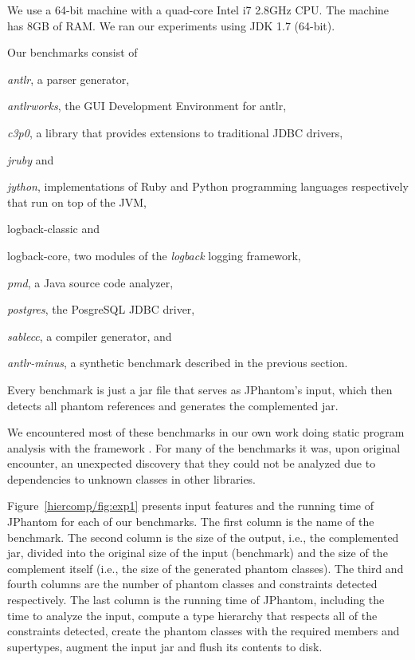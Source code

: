 We use a 64-bit machine with a quad-core Intel i7 2.8GHz CPU. The
machine has 8GB of RAM. We ran our experiments using JDK 1.7
(64-bit).

Our benchmarks consist of
\begin{inparaenum}[(1)]
\item \emph{antlr}, a parser generator,
\item \emph{antlrworks}, the GUI Development Environment for antlr,
\item \emph{c3p0}, a library that provides extensions to traditional
  JDBC drivers,
\item \emph{jruby} and
\item \emph{jython}, implementations of Ruby and Python programming
  languages respectively that run on top of the JVM,
\item logback-classic and
\item logback-core, two modules of the \emph{logback} logging
  framework,
\item \emph{pmd}, a Java source code analyzer,
\item \emph{postgres}, the PosgreSQL JDBC driver,
\item \emph{sablecc}, a compiler generator, and
\item \emph{antlr-minus}, a synthetic benchmark described in the
  previous section.
\end{inparaenum}
Every benchmark is just a jar file that serves as JPhantom's
input, which then detects all phantom references and generates the
complemented jar.

We encountered most of these benchmarks in our own work doing static
program analysis with the \doop{} framework
\cite{oopsla/BravenboerS09,pldi/KastrinisS13}. For many of the
benchmarks it was, upon original encounter, an unexpected discovery
that they could not be analyzed due to dependencies to unknown classes
in other libraries.

Figure~\ref{hiercomp/fig:exp1} presents input features and the running time of
JPhantom for each of our benchmarks. The first column is the name of
the benchmark. The second column is the size of the output, i.e., the
complemented jar, divided into the original size of the input
(benchmark) and the size of the complement itself (i.e., the size of
the generated phantom classes). The third and fourth columns are the
number of phantom classes and constraints detected respectively. The
last column is the running time of JPhantom, including the time to
analyze the input, compute a type hierarchy that respects all of the
constraints detected, create the phantom classes with the required
members and supertypes, augment the input jar and flush its contents
to disk.

